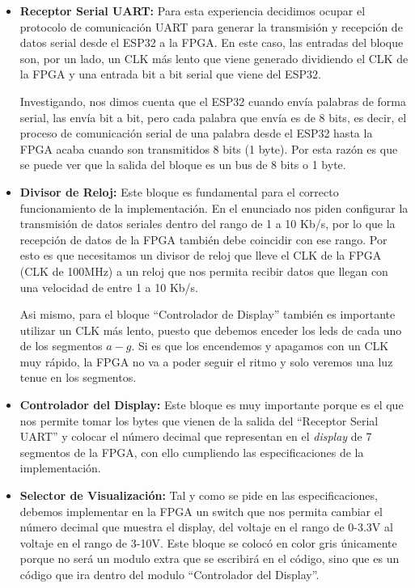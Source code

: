 \documentclass[letterpaper, 12pt]{article}
\begin{document}
\begin{itemize}
    \item[\textbf{1.}] \textbf{Receptor Serial UART:} Para esta experiencia decidimos ocupar el protocolo de comunicación UART para generar la transmisión y recepción de datos serial desde el ESP32 a la FPGA. En este caso, las entradas del bloque son, por un lado, un CLK más lento que viene generado dividiendo el CLK de la FPGA y una entrada bit a bit serial que viene del ESP32.

    Investigando, nos dimos cuenta que el ESP32 cuando envía palabras de forma serial, las envía bit a bit, pero cada palabra que envía es de 8 bits, es decir, el proceso de comunicación serial de una palabra desde el ESP32 hasta la FPGA acaba cuando son transmitidos 8 bits (1 byte). Por esta razón es que se puede ver que la salida del bloque es un bus de 8 bits o 1 byte.

    \item[\textbf{2.}] \textbf{Divisor de Reloj:} Este bloque es fundamental para el correcto funcionamiento de la implementación. En el enunciado nos piden configurar la transmisión de datos seriales dentro del rango de 1 a 10 Kb/s, por lo que la recepción de datos de la FPGA también debe coincidir con ese rango. Por esto es que necesitamos un divisor de reloj que lleve el CLK de la FPGA (CLK de 100MHz) a un reloj que nos permita recibir datos que llegan con una velocidad de entre 1 a 10 Kb/s.

    Asi mismo, para el bloque ``Controlador de Display'' también es importante utilizar un CLK más lento, puesto que debemos enceder los leds de cada uno de los segmentos $a-g$. Si es que los encendemos y apagamos con un CLK muy rápido, la FPGA no va a poder seguir el ritmo y solo veremos una luz tenue en los segmentos.

    \item[\textbf{3.}] \textbf{Controlador del Display:} Este bloque es muy importante porque es el que nos permite tomar los bytes que vienen de la salida del ``Receptor Serial UART'' y colocar el número decimal que representan en el \textit{display} de 7 segmentos de la FPGA, con ello cumpliendo las especificaciones de la implementación.

    \item[\textbf{3.1}] \textbf{Selector de Visualización:} Tal y como se pide en las especificaciones, debemos implementar en la FPGA un switch que nos permita cambiar el número decimal que muestra el display, del voltaje en el rango de 0-3.3V al voltaje en el rango de 3-10V. Este bloque se colocó en color gris únicamente porque no será un modulo extra que se escribirá en el código, sino que es un código que ira dentro del modulo ``Controlador del Display''.
\end{itemize}
\end{document}
